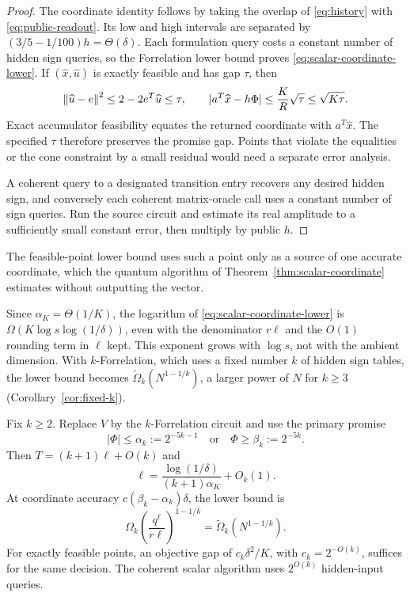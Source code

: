 \begin{proof}
The coordinate identity follows by taking the overlap of
\eqref{eq:history} with \eqref{eq:public-readout}.  Its low and high
intervals are separated by $(3/5-1/100)h=\Theta(\delta)$.
Each formulation query costs a constant number
of hidden sign queries, so the
Forrelation lower bound proves \eqref{eq:scalar-coordinate-lower}.
If $(\widehat x,\widehat u)$ is exactly feasible and has gap $\tau$, then
\[
 \left\lVert\widehat u-e\right\rVert^2\leq2-2e^T\widehat u\leq\tau,
 \qquad
 |a^T\widehat x-h\Phi|
 \leq\frac{K}{R}\sqrt\tau\leq\sqrt{K\tau}.
\]
Exact accumulator feasibility equates the returned coordinate with
$a^T\widehat x$.  The specified $\tau$ therefore preserves the promise
gap.  Points that violate the
equalities or the cone constraint by a small residual would need a
separate error analysis.

A coherent query to a designated transition entry recovers any desired
hidden sign, and conversely each coherent matrix-oracle call uses a
constant number of sign queries.  Run the source circuit and estimate
its real amplitude to a sufficiently small constant error, then multiply
by public $h$.
\end{proof}

The feasible-point lower bound uses such a point only as a source of one
accurate coordinate, which the quantum algorithm of
Theorem~\ref{thm:scalar-coordinate} estimates without outputting the vector.

Since $\alpha_K=\Theta(1/K)$, the logarithm of
\eqref{eq:scalar-coordinate-lower} is
$\Omega(K\log s\log(1/\delta))$, even with the denominator $r\ell$ and
the $O(1)$ rounding term in $\ell$ kept.  This exponent
grows with $\log s$, not with the ambient dimension.  With
$k$-Forrelation, which uses a fixed number $k$ of hidden sign tables, the
lower bound becomes $\widetilde\Omega_k(N^{1-1/k})$, a larger power of $N$
for $k\geq3$ (Corollary~\ref{cor:fixed-k}).

\begin{corollary}\label{cor:fixed-k}
Fix $k\geq2$.  Replace $V$ by the $k$-Forrelation circuit and use the
primary promise
\[
 |\Phi|\leq\alpha_k:=2^{-5k-1}
 \quad\text{or}\quad \Phi\geq\beta_k:=2^{-5k}.
\]
Then $T=(k+1)\ell+O(k)$ and
\[
 \ell=\frac{\log(1/\delta)}{(k+1)\alpha_K}+O_k(1).
\]
At coordinate accuracy $c(\beta_k-\alpha_k)\delta$, the lower bound is
\begin{equation}\label{eq:fixed-k-lower}
 \Omega_k\left(\frac{q^\ell}{r\ell}\right)^{1-1/k}
 =\widetilde\Omega_k(N^{1-1/k}).
\end{equation}
For exactly feasible points, an objective gap of $c_k\delta^2/K$, with
$c_k=2^{-O(k)}$, suffices for the same decision.
The coherent scalar algorithm uses $2^{O(k)}$ hidden-input queries.
\end{corollary}

